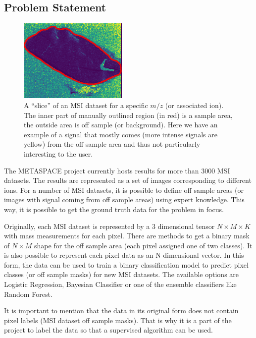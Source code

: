 \documentclass[a4paper]{article}
\begin{document}
    \subsection*{Problem Statement}
    
    \begin{figure}[H]
        \centering
        \caption{A “slice” of an MSI dataset for a specific $m/z$ (or associated ion).
        The inner part of manually outlined region (in red) is a sample area, the outside area
        is off sample (or background).
        Here we have an example of a signal that mostly comes (more intense signals are yellow) from
        the off sample area and thus not particularly interesting to the user.}
        \includegraphics[width=\textwidth,height=4cm,keepaspectratio]{ion_image_1.png}
    \end{figure}
    
    The METASPACE project currently hosts results for more than 3000 MSI datasets. The results
    are represented as a set of images corresponding to different ions. For a number of MSI
    datasets, it is possible to define off sample areas (or images with signal coming from off sample areas)
    using expert knowledge. This way, it is possible to get the ground truth data for the problem in focus.
    
    Originally, each MSI dataset is represented by a 3 dimensional tensor $N \times M \times K$
    with mass measurements for each pixel.
    There are methods to get a binary mask of $N \times M$ shape for the off sample area
    (each pixel assigned one of two classes).
    It is also possible to represent each pixel data as an N dimensional vector.
    In this form, the data can be used to train a binary classification model
    to predict pixel classes (or off sample masks) for new MSI datasets. The available options are
    Logistic Regression, Bayesian Classifier or one of the ensemble classifiers like Random Forest.
    
    It is important to mention that the data in its original form does not contain pixel labels
    (MSI dataset off sample masks). That is why it is a part of the project to label the data so that
    a supervised algorithm can be used.
    
\end{document}
